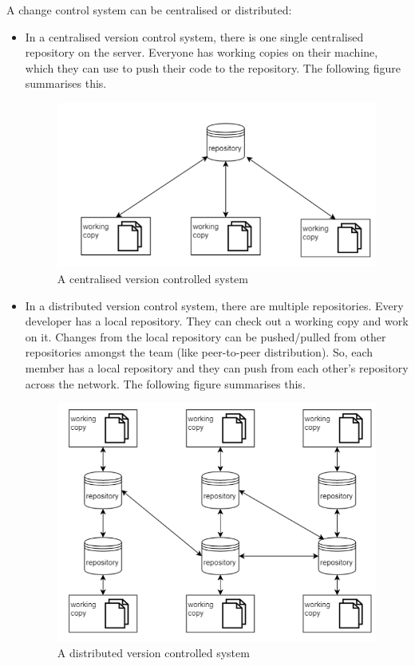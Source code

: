 \documentclass[a4paper, openany]{memoir}
\begin{document}
A change control system can be centralised or distributed:
\begin{itemize}
    \item In a centralised version control system, there is one single centralised repository on the server. Everyone has working copies on their machine, which they can use to push their code to the repository. The following figure summarises this.
    \begin{figure}[H]
        \centering
        \includegraphics[scale=0.65]{src/3.8 Centalised.png}
        \caption{A centralised version controlled system}
    \end{figure}

    \item In a distributed version control system, there are multiple repositories. Every developer has a local repository. They can check out a working copy and work on it. Changes from the local repository can be pushed/pulled from other repositories amongst the team (like peer-to-peer distribution). So, each member has a local repository and they can push from each other's repository across the network. The following figure summarises this.
    \begin{figure}[H]
        \centering
        \includegraphics[scale=0.6]{src/3.6 Distributed.png}
        \caption{A distributed version controlled system}
    \end{figure}
\end{itemize}
\end{document}
